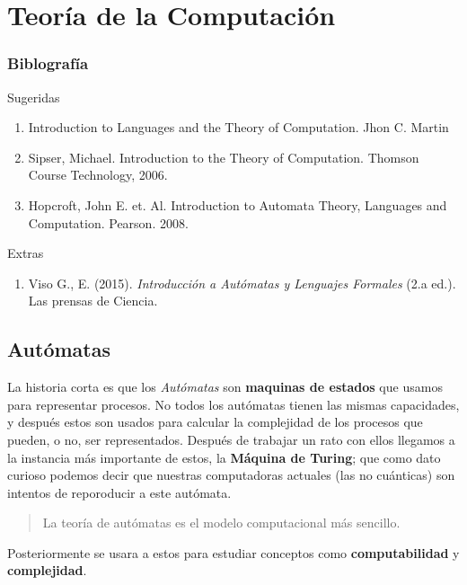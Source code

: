 \documentclass[12pt]{book}
\begin{document}
\listoftheorems
\tableofcontents


\part{Teor\'ia de la Computaci\'on}

\section*{Biblograf\'ia}
	
	\par Sugeridas
	\begin{enumerate}
		\item Introduction to Languages and the Theory of Computation. Jhon C. Martin
		\item Sipser, Michael. Introduction to the Theory of Computation. Thomson Course Technology, 2006.
		\item Hopcroft, John E. et. Al. Introduction to Automata Theory, Languages and Computation. Pearson. 2008.
	\end{enumerate}
	
	\par Extras
	\begin{enumerate}
		\item Viso G., E. (2015). \textit{Introducción a Autómatas y Lenguajes Formales} (2.a ed.). Las prensas de Ciencia.
	\end{enumerate}

\chapter{Aut\'omatas}

	\par La historia corta es que los \textit{Aut\'omatas} son  \textbf{maquinas de estados} que usamos para representar procesos. No todos los aut\'omatas tienen las mismas capacidades, y despu\'es estos son usados para calcular la complejidad de los procesos que pueden, o no, ser representados. Despu\'es de trabajar un rato con ellos llegamos a la instancia m\'as importante de estos, la \textbf{M\'aquina de Turing}; que como dato curioso podemos decir que nuestras computadoras actuales (las no cu\'anticas) son intentos de reporoducir a este aut\'omata.
	\begin{quote}
		La teor\'ia de aut\'omatas es el modelo computacional m\'as sencillo.
	\end{quote}
	Posteriormente se usara a estos para estudiar conceptos como \textbf{computabilidad} y \textbf{complejidad}.
	
\end{document}
